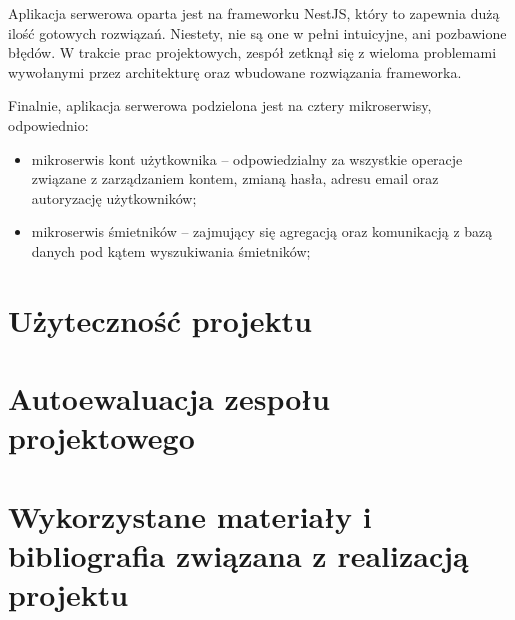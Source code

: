 \documentclass[12pt, a4paper, twoside, openany]{book}
\newcommand{\forceindent}{\leavevmode{\parindent=1.3em\indent}}
\begin{document}
\forceindent Aplikacja serwerowa oparta jest na frameworku NestJS, który to zapewnia dużą ilość gotowych rozwiązań. Niestety, nie są one w pełni intuicyjne, ani pozbawione błędów.
W trakcie prac projektowych, zespół zetknął się z wieloma problemami wywołanymi przez architekturę oraz wbudowane rozwiązania frameworka.

Finalnie, aplikacja serwerowa podzielona jest na cztery mikroserwisy, odpowiednio:
\begin{itemize}[label=--]
    \item mikroserwis kont użytkownika -- odpowiedzialny za wszystkie operacje związane z zarządzaniem kontem, zmianą hasła, adresu email oraz autoryzację użytkowników;
    \item mikroserwis śmietników -- zajmujący się agregacją oraz komunikacją z bazą danych pod kątem wyszukiwania śmietników;
\end{itemize}

\section{Użyteczność projektu}

\section{Autoewaluacja zespołu projektowego}

\section{Wykorzystane materiały i bibliografia związana z realizacją projektu}

\end{document}
